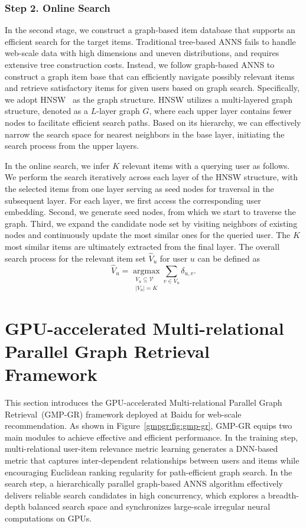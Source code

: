 \subsubsection{Step 2. Online Search}
In the second stage, we construct a graph-based item database that supports an efficient search for the target items.
Traditional tree-based ANNS fails to handle web-scale data with high dimensions and uneven distributions, and requires extensive tree construction costs.
Instead, we follow graph-based ANNS to construct a graph item base that can efficiently navigate possibly relevant items and retrieve satisfactory items for given users based on graph search.
Specifically, we adopt HNSW~\cite{malkov2018efficient} as the graph structure.
HNSW utilizes a multi-layered graph structure, denoted as a $L$-layer graph $G$, where each upper layer contains fewer nodes to facilitate efficient search paths. Based on its hierarchy, we can effectively narrow the search space for nearest neighbors in the base layer, initiating the search process from the upper layers.

In the online search, we infer $K$ relevant items with a querying user as follows. We perform the search iteratively across each layer of the HNSW structure, with the selected items from one layer serving as seed nodes for traversal in the subsequent layer. For each layer, we first access the corresponding user embedding. Second, we generate seed nodes, from which we start to traverse the graph. Third, we expand the candidate node set by visiting neighbors of existing nodes and continuously update the most similar ones for the queried user. The $K$ most similar items are ultimately extracted from the final layer.
The overall search process for the relevant item set $\hat{V}_u$ for user $u$ can be defined as
\begin{equation}
    \hat{V}_u = \mathop{\arg\max}\limits_{\substack{V_u \subseteq \mathcal{V} \\ |V_u|=K}} \sum\limits_{v \in V_u} \delta_{u,v}.
\end{equation}


\section{GPU-accelerated Multi-relational Parallel Graph Retrieval Framework}

This section introduces the GPU-accelerated Multi-relational Parallel Graph Retrieval~(GMP-GR) framework deployed at Baidu for web-scale recommendation.
As shown in Figure~\ref{gmpgr:fig:gmp-gr}, GMP-GR equips two main modules to achieve effective and efficient performance.
In the training step, multi-relational user-item relevance metric learning generates a DNN-based metric that captures inter-dependent relationships between users and items while encouraging Euclidean ranking regularity for path-efficient graph search.
In the search step, a hierarchically parallel graph-based ANNS algorithm effectively delivers reliable search candidates in high concurrency, which explores a breadth-depth balanced search space and synchronizes large-scale irregular neural computations on GPUs.


